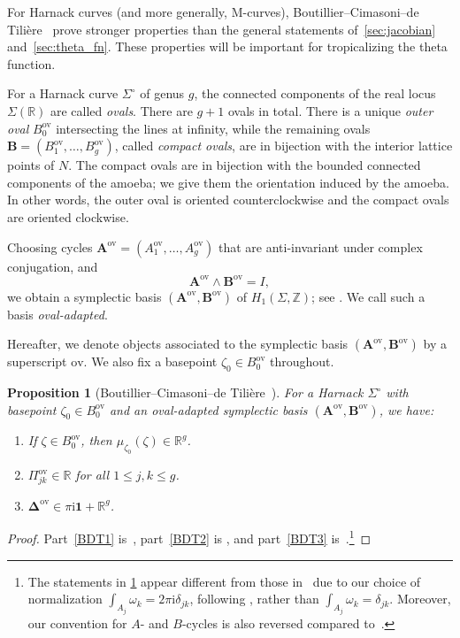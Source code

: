 \documentclass[12pt]{amsart}
\makeatletter
\numberwithin{equation}{section}
\newcommand{\itemrefperh@ps}[2]{\textup{#2}}
\newcommand{\itemref}[1]{\begingroup\let\perh@ps\itemrefperh@ps\ref{#1}\endgroup}
\newtheorem{proposition}[theorem]{Proposition}
\theoremstyle{definition}
\newcommand{\Z}{\mathbb{Z}}
\newcommand{\R}{\mathbb{R}}
\def\imunit{{\mathrm{i}}}
\def\onebf{\mathbf{1}}
\def\spectralcurve{\Sigma}
\def\openspectralcurve{{\Sigma^{\circ}}}
\def\vecRC{\bm{\Delta}}
\def\ptSig{\zeta}
\def\basept{{\ptSig_0}}
\def\mcurve{\Sigma}
\makeatother
\begin{document}
For Harnack curves (and more generally, M-curves), Boutillier--Cimasoni--de Tili\`ere~{\cite{BDdT}} prove stronger properties than the general statements of~\cref{sec:jacobian} and~\cref{sec:theta_fn}. These properties will be important for tropicalizing the theta function.

For a Harnack curve $\openspectralcurve$ of genus $g$, the connected components of the real locus 
$\spectralcurve(\R)$ are called \emph{ovals}. 
There are $g+1$ ovals in total. 
There is a unique \emph{outer oval} $B_0^{\mathrm{ov}}$ intersecting the lines at infinity, 
while the remaining ovals $\bm B=(B_1^{\mathrm{ov}},\dots,B_g^{\mathrm{ov}})$, called \emph{compact ovals}, 
are in bijection with the interior lattice points of $N$. The compact ovals are in bijection with the bounded connected components of the amoeba; we give them the orientation induced by the amoeba. In other words, the outer oval is oriented counterclockwise and the compact ovals are oriented clockwise.


Choosing cycles
$
\bm A^{\mathrm{ov}}
=
(A_1^{\mathrm{ov}},\dots,A_g^{\mathrm{ov}})
$
that are anti-invariant under complex conjugation, and
\[
\bm A^{\mathrm{ov}} \wedge \bm B^{\mathrm{ov}} = I,
\]
we obtain a symplectic basis
$
(\bm A^{\mathrm{ov}},\bm B^{\mathrm{ov}})
$
of $H_1(\mcurve,\Z)$; see \cite[Section 2.2.4]{KenyonOkounkovHarnack}. We call such a basis \emph{oval-adapted}. 

Hereafter, we denote objects associated to the symplectic basis $(\bm A^{\mathrm{ov}}, \bm B^{\mathrm{ov}})$ by a superscript $\mathrm{ov}$. We also fix a basepoint $\basept \in B_0^\mathrm{ov}$ throughout.


\begin{proposition} [Boutillier--Cimasoni--de Tili\`ere~{\cite{BDdT}}] \label{prop:omega_and_delta_pos}
		For a Harnack $\openspectralcurve$ with basepoint $\basept \in B_0^{\mathrm{ov}}$ and an oval-adapted symplectic basis $(\bm A^{\mathrm{ov}}, \bm B^{\mathrm{ov}})$, we have:
		\begin{enumerate}[label=(\arabic*)]
			\item\label{BDT1} If $\ptSig \in B_0^{\mathrm{ov}}$, then $\mu_\basept(\ptSig) \in  \R^{g}$.
			\item\label{BDT2} $\Pi^{\mathrm{ov}}_{jk} \in \R$ for all $1 \leq j,k \leq g$.
			\item\label{BDT3} $\vecRC^{\mathrm{ov}} \in \pi \imunit \onebf + \R^{g}$.
		\end{enumerate}
	\end{proposition}
\begin{proof}
	Part~\itemref{BDT1} is~\cite[Lemma~15(2)]{BDdT}, part~\itemref{BDT2} is \cite[Lemma~11(3)]{BDdT}, and part~\itemref{BDT3} is~\cite[Lemma~19]{BDdT}.\footnote{The statements in \cref{prop:omega_and_delta_pos} appear different from those in~\cite{BDdT} due to our choice of normalization $\int_{A_j} \omega_k = 2\pi \imunit \delta_{jk}$, following \cite{Fay}, rather than $\int_{A_j} \omega_k = \delta_{jk}$. Moreover, our convention for $A$- and $B$-cycles is also reversed compared to~\cite{BDdT}.}
\end{proof}
\end{document}
